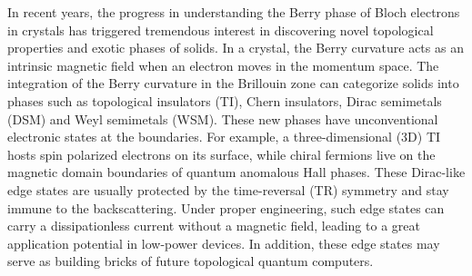 %
%
%
%
%
%
%

In recent years, the progress in understanding the Berry phase of Bloch electrons in crystals has triggered tremendous interest in discovering  novel topological properties and exotic phases of solids. In a crystal, the Berry curvature acts as an intrinsic magnetic field when an electron moves in the momentum space. The integration of  the Berry curvature in the Brillouin zone can categorize solids into phases such as topological insulators (TI), Chern insulators, Dirac semimetals (DSM) and Weyl semimetals (WSM). These new phases have unconventional electronic states at the boundaries. For example, a three-dimensional (3D) TI hosts spin polarized electrons on its surface, while chiral fermions live on the magnetic domain boundaries of quantum anomalous Hall phases. These Dirac-like edge states are usually protected by the time-reversal (TR) symmetry and stay immune to the backscattering. Under proper engineering, such edge states can carry a dissipationless current without a magnetic field, leading to a great application potential in low-power devices. In addition, these edge states may serve as building bricks of future topological quantum computers.

